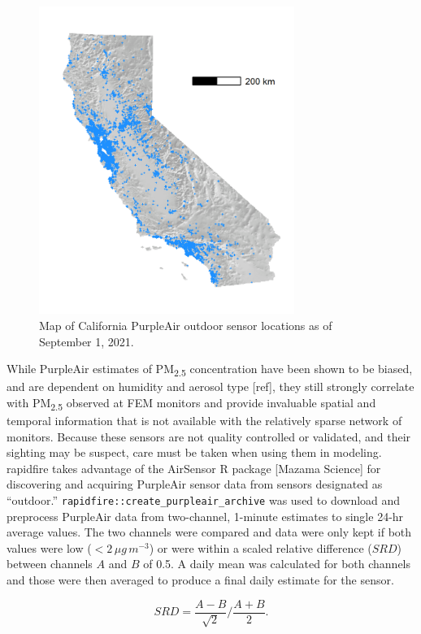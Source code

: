 \documentclass[gmd, manuscript]{copernicus}
\begin{document}
\begin{figure}[h]
\includegraphics[width=8.3cm]{./Figures/SensorsGMD} \caption{Map of California PurpleAir outdoor sensor locations as of September 1, 2021.}\label{fig:sensors}
\end{figure}

While PurpleAir estimates of PM\textsubscript{2.5} concentration have
been shown to be biased, and are dependent on humidity and aerosol type
{[}ref{]}, they still strongly correlate with PM\textsubscript{2.5}
observed at FEM monitors and provide invaluable spatial and temporal
information that is not available with the relatively sparse network of
monitors. Because these sensors are not quality controlled or validated,
and their sighting may be suspect, care must be taken when using them in
modeling.\\
rapidfire takes advantage of the AirSensor R package {[}Mazama
Science{]} for discovering and acquiring PurpleAir sensor data from
sensors designated as ``outdoor.''
\texttt{rapidfire::create\_purpleair\_archive} was used to download and
preprocess PurpleAir data from two-channel, 1-minute estimates to single
24-hr average values. The two channels were compared and data were only
kept if both values were low (\(<2\,\unit{\mu g\,m^{-3}}\)) or were
within a scaled relative difference (\(SRD\)) between channels \(A\) and
\(B\) of 0.5. A daily mean was calculated for both channels and those
were then averaged to produce a final daily estimate for the sensor.

\begin{equation}
SRD=\frac{A-B}{\sqrt{2}}/\frac{A+B}{2}.  
\end{equation}
\end{document}
